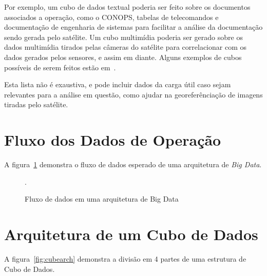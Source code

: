 Por exemplo, um cubo de dados textual poderia ser feito sobre os documentos associados a operação, como o CONOPS, tabelas de telecomandos e documentação de engenharia de sistemas para facilitar a análise da documentação sendo gerada pelo satélite. Um cubo multimídia poderia ser gerado sobre os dados multimídia tirados pelas câmeras do satélite para correlacionar com os dados gerados pelos sensores, e assim em diante. Alguns exemplos de cubos possíveis de serem feitos estão em~\cite{silva:2015:abordagensParaCubo}.

Esta lista não é exaustiva, e pode incluir dados da carga útil caso sejam relevantes para a análise em questão, como ajudar na georeferênciação de imagens tiradas pelo satélite.

\section{Fluxo dos Dados de Operação}

A figura~\ref{fig:bigdataflow} demonstra o fluxo de dados esperado de uma arquitetura de \textit{Big Data}.

\begin{figure}[ht]
	\caption{Fluxo de dados em uma arquitetura de Big Data}
	\vspace{6mm}
	\begin{center}
	\end{center}
	\vspace{2mm}
	\legenda{}
	.
	\label{fig:bigdataflow}
\end{figure}

\section{Arquitetura de um Cubo de Dados}

A figura~\ref{fig:cubearch} demonstra a divisão em 4 partes de uma estrutura de Cubo de Dados.

